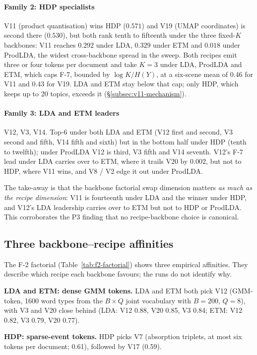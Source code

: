 \documentclass[journal,a4paper,10pt]{IEEEtran}
\begin{document}
\paragraph{Family 2: HDP specialists} V11 (product quantisation) wins
HDP ($0.571$) and V19 (UMAP coordinates) is second there ($0.530$), but
both rank tenth to fifteenth under the three fixed-$K$ backbones: V11
reaches $0.292$ under LDA, $0.329$ under ETM and $0.018$ under ProdLDA,
the widest cross-backbone spread in the sweep. Both recipes emit three
or four tokens per document and take $K = 3$ under LDA, ProdLDA and ETM,
which caps F-7, bounded by $\log K / H(Y)$, at a six-scene mean of 0.46
for V11 and 0.43 for V19. LDA and ETM stay below that cap; only HDP,
which keeps up to 20 topics, exceeds it
(\S\ref{subsec:v11-mechanism}).

\paragraph{Family 3: LDA and ETM leaders} V12, V3, V14. Top-6 under
both LDA and ETM (V12 first and second, V3 second and fifth, V14 fifth
and sixth) but in the bottom half under HDP (tenth to twelfth); under
ProdLDA V12 is third, V3 fifth and V14 seventh. V12's F-7 lead under
LDA carries over to ETM, where it trails V20 by 0.002, but not to HDP,
where V11 wins, and V8 / V2 edge it out under ProdLDA.

The take-away is that the backbone factorial swap dimension matters
\emph{as much as the recipe dimension}: V11 is fourteenth under LDA
and the winner under HDP, and V12's LDA leadership carries over to ETM
but not to HDP or ProdLDA. This corroborates the P3 finding that no
recipe-backbone choice is canonical.

\subsection{Three backbone--recipe affinities}\label{sec:affinities}

The F-2 factorial (Table~\ref{tab:f2-factorial}) shows three empirical
affinities. They describe which recipe each backbone favours; the runs
do not identify why.

\textbf{LDA and ETM: dense GMM tokens.} LDA and ETM both pick V12
(GMM-token, 1600 word types from the $B \times Q$ joint vocabulary with
$B=200$, $Q=8$), with V3 and V20 close behind (LDA: V12 0.88, V20
0.85, V3 0.84; ETM: V12 0.82, V3 0.79, V20 0.77).

\textbf{HDP: sparse-event tokens.} HDP picks V7 (absorption triplets,
at most six tokens per document; 0.61), followed by V17 (0.59).
\end{document}
